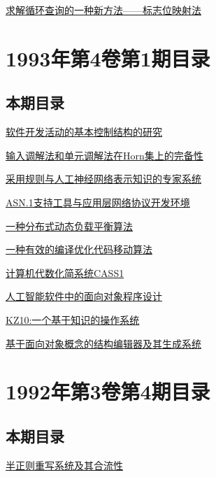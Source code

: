 \documentclass[a4paper]{article}
\begin{document}
\href{http://www.jos.org.cn/ch/reader/download_pdf.aspx?file_no=19930209&year_id=1993&quarter_id=2&falg=1}{求解循环查询的一种新方法——标志位映射法}


\section{\textbf{1993年第4卷第1期目录}}
\subsection{本期目录}
\href{http://www.jos.org.cn/ch/reader/download_pdf.aspx?file_no=19930101&year_id=1993&quarter_id=1&falg=1}{软件开发活动的基本控制结构的研究}

\href{http://www.jos.org.cn/ch/reader/download_pdf.aspx?file_no=19930102&year_id=1993&quarter_id=1&falg=1}{输入调解法和单元调解法在Horn集上的完备性}

\href{http://www.jos.org.cn/ch/reader/download_pdf.aspx?file_no=19930103&year_id=1993&quarter_id=1&falg=1}{采用规则与人工神经网络表示知识的专家系统}

\href{http://www.jos.org.cn/ch/reader/download_pdf.aspx?file_no=19930104&year_id=1993&quarter_id=1&falg=1}{ASN.1支持工具与应用层网络协议开发环境}

\href{http://www.jos.org.cn/ch/reader/download_pdf.aspx?file_no=19930105&year_id=1993&quarter_id=1&falg=1}{一种分布式动态负载平衡算法}

\href{http://www.jos.org.cn/ch/reader/download_pdf.aspx?file_no=19930106&year_id=1993&quarter_id=1&falg=1}{一种有效的编译优化代码移动算法}

\href{http://www.jos.org.cn/ch/reader/download_pdf.aspx?file_no=19930107&year_id=1993&quarter_id=1&falg=1}{计算机代数化简系统CASS1}

\href{http://www.jos.org.cn/ch/reader/download_pdf.aspx?file_no=19930108&year_id=1993&quarter_id=1&falg=1}{人工智能软件中的面向对象程序设计}

\href{http://www.jos.org.cn/ch/reader/download_pdf.aspx?file_no=19930109&year_id=1993&quarter_id=1&falg=1}{KZ10:一个基于知识的操作系统}

\href{http://www.jos.org.cn/ch/reader/download_pdf.aspx?file_no=19930110&year_id=1993&quarter_id=1&falg=1}{基于面向对象概念的结构编辑器及其生成系统}


\section{\textbf{1992年第3卷第4期目录}}
\subsection{本期目录}
\href{http://www.jos.org.cn/ch/reader/download_pdf.aspx?file_no=19920401&year_id=1992&quarter_id=4&falg=1}{半正则重写系统及其合流性}
\end{document}
